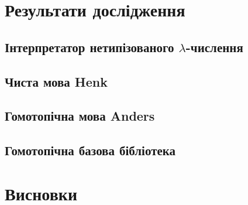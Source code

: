\documentclass{article}
\begin{document}
\section{Результати дослідження}

\subsection{Інтерпретатор нетипізованого $\lambda$-числення}

\subsection{Чиста мова Henk}

\subsection{Гомотопічна мова Anders}

\subsection{Гомотопічна базова бібліотека}

\section{Висновки}

\cite{Lof72}
\cite{Lof84}
\cite{Coq88}
\cite{Hofmann96}
\cite{Henk93}
\cite{Erik97}
\cite{Hermida95}
\cite{Curien08}
\cite{MacLane71}
\cite{Lawvere09}
\cite{Dybjer08}
\cite{Clairambault05}
\cite{Abel08}
\cite{Seely84}
\cite{Curien14}
\cite{Castellan14}
\cite{Voevodsky14}
\cite{Dybjer95}
\cite{Bishop67}
\cite{Nordstrom90}
\cite{Hermida98}
\cite{Barthe00}
\cite{Voevodsky15}
\cite{Sozeau}
\cite{Selsam16}
\cite{Bohm85}
\cite{Pfenning89}
\cite{Wadler90}
\cite{Gambino03}
\cite{Dybjer94}
\cite{Jacobs97}
\cite{Vene00}
\cite{Basold16}
\cite{Hofmann94}
\cite{Jacobs99}
\cite{Joyal14}
\cite{HoTT13}
\cite{Mortberg17}
\cite{Shulman15}
\cite{Orton17}
\cite{Huber16}
\cite{Huber17}
\cite{Angiuli16}
\cite{Angiuli162}



\end{document}
